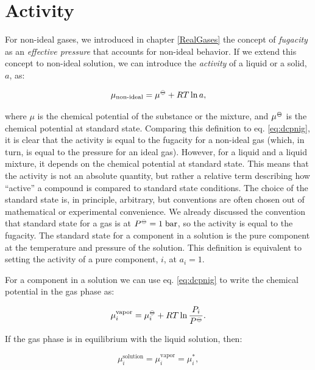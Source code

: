 \documentclass[
  9pt,
]{extbook}
\theoremstyle{definition}
\theoremstyle{definition}
\theoremstyle{definition}
\theoremstyle{definition}
\theoremstyle{remark}
\begin{document}
\section{Activity}\label{activity}

For non-ideal gases, we introduced in chapter \ref{RealGases} the concept of \emph{fugacity} as an \emph{effective pressure} that accounts for non-ideal behavior. If we extend this concept to non-ideal solution, we can introduce the \emph{activity} of a liquid or a solid, \(a\), as:

\begin{equation}
\mu_{\text{non-ideal}} = \mu^{{-\kern-6pt{\ominus}\kern-6pt-}} + RT \ln a,
\label{eq:act1}
\end{equation}

where \(\mu\) is the chemical potential of the substance or the mixture, and \(\mu^{{-\kern-6pt{\ominus}\kern-6pt-}}\) is the chemical potential at standard state. Comparing this definition to eq. \eqref{eq:dcpnig}, it is clear that the activity is equal to the fugacity for a non-ideal gas (which, in turn, is equal to the pressure for an ideal gas). However, for a liquid and a liquid mixture, it depends on the chemical potential at standard state. This means that the activity is not an absolute quantity, but rather a relative term describing how ``active'' a compound is compared to standard state conditions. The choice of the standard state is, in principle, arbitrary, but conventions are often chosen out of mathematical or experimental convenience. We already discussed the convention that standard state for a gas is at \(P^{{-\kern-6pt{\ominus}\kern-6pt-}}=1\;\text{bar}\), so the activity is equal to the fugacity. The standard state for a component in a solution is the pure component at the temperature and pressure of the solution. This definition is equivalent to setting the activity of a pure component, \(i\), at \(a_i=1\).

For a component in a solution we can use eq. \eqref{eq:dcpnig} to write the chemical potential in the gas phase as:

\begin{equation}
\mu_i^{\text{vapor}} = \mu_i^{{-\kern-6pt{\ominus}\kern-6pt-}} + RT \ln \frac{P_i}{P^{{-\kern-6pt{\ominus}\kern-6pt-}}}.
\label{eq:act2}
\end{equation}

If the gas phase is in equilibrium with the liquid solution, then:

\begin{equation}
\mu_i^{\text{solution}} = \mu_i^{\text{vapor}} = \mu_i^*,
\label{eq:act3}
\end{equation}
\end{document}
